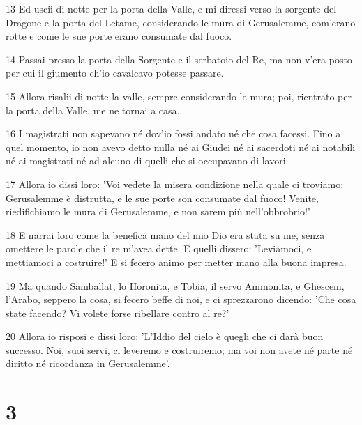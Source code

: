 \par 13 Ed uscii di notte per la porta della Valle, e mi diressi verso la sorgente del Dragone e la porta del Letame, considerando le mura di Gerusalemme, com'erano rotte e come le sue porte erano consumate dal fuoco.
\par 14 Passai presso la porta della Sorgente e il serbatoio del Re, ma non v'era posto per cui il giumento ch'io cavalcavo potesse passare.
\par 15 Allora risalii di notte la valle, sempre considerando le mura; poi, rientrato per la porta della Valle, me ne tornai a casa.
\par 16 I magistrati non sapevano né dov'io fossi andato né che cosa facessi. Fino a quel momento, io non avevo detto nulla né ai Giudei né ai sacerdoti né ai notabili né ai magistrati né ad alcuno di quelli che si occupavano di lavori.
\par 17 Allora io dissi loro: 'Voi vedete la misera condizione nella quale ci troviamo; Gerusalemme è distrutta, e le sue porte son consumate dal fuoco! Venite, riedifichiamo le mura di Gerusalemme, e non sarem più nell'obbrobrio!'
\par 18 E narrai loro come la benefica mano del mio Dio era stata su me, senza omettere le parole che il re m'avea dette. E quelli dissero: 'Leviamoci, e mettiamoci a costruire!' E si fecero animo per metter mano alla buona impresa.
\par 19 Ma quando Samballat, lo Horonita, e Tobia, il servo Ammonita, e Ghescem, l'Arabo, seppero la cosa, si fecero beffe di noi, e ci sprezzarono dicendo: 'Che cosa state facendo? Vi volete forse ribellare contro al re?'
\par 20 Allora io risposi e dissi loro: 'L'Iddio del cielo è quegli che ci darà buon successo. Noi, suoi servi, ci leveremo e costruiremo; ma voi non avete né parte né diritto né ricordanza in Gerusalemme'.

\chapter{3}


